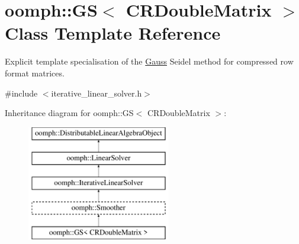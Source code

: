 \hypertarget{classoomph_1_1GS_3_01CRDoubleMatrix_01_4}{}\section{oomph\+:\+:GS$<$ C\+R\+Double\+Matrix $>$ Class Template Reference}
\label{classoomph_1_1GS_3_01CRDoubleMatrix_01_4}


Explicit template specialisation of the \hyperlink{classoomph_1_1Gauss}{Gauss} Seidel method for compressed row format matrices.  




{\ttfamily \#include $<$iterative\+\_\+linear\+\_\+solver.\+h$>$}

Inheritance diagram for oomph\+:\+:GS$<$ C\+R\+Double\+Matrix $>$\+:\begin{figure}[H]
\begin{center}
\leavevmode
\includegraphics[height=5.000000cm]{classoomph_1_1GS_3_01CRDoubleMatrix_01_4}
\end{center}
\end{figure}
